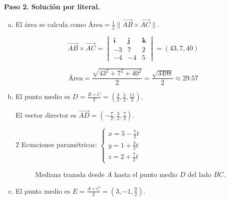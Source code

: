 \begin{prob}
\begin{myproof}
\textbf{Paso 2. Solución por literal.}
\begin{enumerate}[a)]
\item El área se calcula como $\text{Área} = \frac{1}{2}\|\overrightarrow{AB} \times \overrightarrow{AC}\|$.

$$\overrightarrow{AB} \times \overrightarrow{AC} = \begin{vmatrix}
\mathbf{i} & \mathbf{j} & \mathbf{k} \\
-3 & 7 & 2 \\
-4 & -4 & 5
\end{vmatrix} = (43,7,40)$$

$$\text{Área} = \frac{\sqrt{43^2+7^2+40^2}}{2} = \boxed{\frac{\sqrt{3498}}{2} \approx 29.57}$$

\item El punto medio es $D = \frac{B+C}{2} = \left(\frac{3}{2}, \frac{5}{2}, \frac{11}{2}\right)$.

El vector director es $\overrightarrow{AD} = \left(-\frac{7}{2}, \frac{3}{2}, \frac{7}{2}\right)$.

\begin{multicols}{2}
Ecuaciones paramétricas: $\boxed{\left\{\begin{matrix}
x = 5 - \frac{7}{2}t\\
y = 1 + \frac{3}{2}t\\
z = 2 + \frac{7}{2}t
\end{matrix}\right.}$

\columnbreak
\begin{figure}[H]
\centering
{}
\caption{Mediana trazada desde $A$ hasta el punto medio $D$ del lado $\overline{BC}$.}
\label{fig:mediana_desde_A}
\end{figure}
\end{multicols}

\item El punto medio es $E = \frac{A+C}{2} = \left(3, -1, \frac{9}{2}\right)$.


\end{enumerate}
\end{myproof}
\end{prob}
